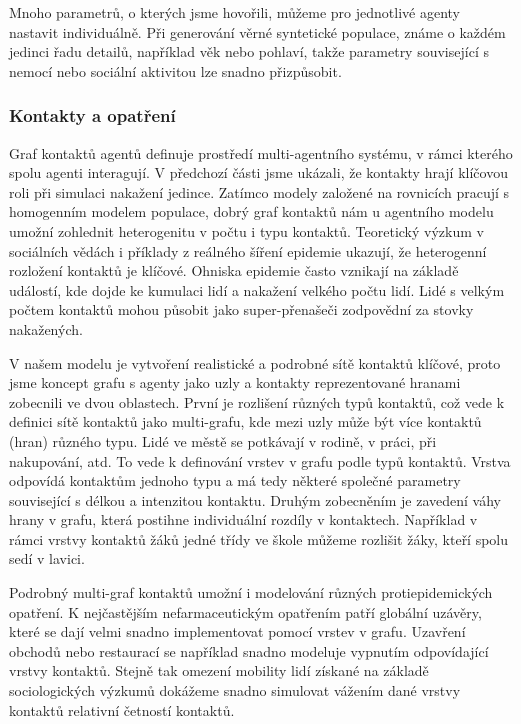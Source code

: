 Mnoho parametrů, o kterých jsme hovořili, můžeme pro jednotlivé agenty nastavit individuálně. Při generování věrné syntetické populace, známe o každém jedinci řadu detailů, například věk nebo pohlaví, takže parametry související s nemocí nebo sociální aktivitou lze snadno přizpůsobit. 




\subsubsection*{Kontakty a opatření}

Graf kontaktů agentů definuje prostředí multi-agentního systému, v rámci kterého spolu agenti interagují. V předchozí části jsme ukázali, že kontakty hrají klíčovou roli při simulaci nakažení jedince. Zatímco modely založené na rovnicích pracují s homogenním modelem populace, dobrý graf kontaktů nám u agentního modelu umožní zohlednit heterogenitu v počtu i typu kontaktů. Teoretický výzkum v sociálních vědách i příklady z reálného šíření epidemie ukazují, že heterogenní rozložení kontaktů je klíčové. Ohniska epidemie často vznikají na základě  událostí, kde dojde ke kumulaci lidí a nakažení velkého počtu lidí. Lidé s velkým počtem kontaktů mohou působit jako super-přenašeči zodpovědní za stovky nakažených.  

V našem modelu je vytvoření realistické a podrobné sítě kontaktů klíčové, proto jsme koncept grafu s agenty jako uzly a kontakty reprezentované hranami zobecnili ve dvou oblastech. První je rozlišení různých typů kontaktů, což vede k definici sítě kontaktů jako multi-grafu, kde mezi uzly může být více kontaktů (hran) různého typu. Lidé ve městě se potkávají v rodině, v práci, při nakupování, atd. To vede k definování vrstev v grafu podle typů kontaktů. Vrstva odpovídá kontaktům jednoho typu a má tedy některé společné parametry související s délkou a intenzitou kontaktu. Druhým zobecněním je zavedení váhy hrany v grafu, která postihne individuální rozdíly v kontaktech. Například v rámci vrstvy kontaktů žáků jedné třídy ve škole můžeme rozlišit žáky, kteří spolu sedí v lavici. 

Podrobný multi-graf kontaktů umožní i modelování různých protiepidemických opatření. K nejčastějším nefarmaceutickým opatřením patří globální uzávěry, které se dají velmi snadno implementovat pomocí vrstev v grafu. Uzavření obchodů nebo restaurací se například snadno modeluje vypnutím odpovídající vrstvy kontaktů. Stejně tak omezení mobility lidí získané na základě sociologických výzkumů dokážeme snadno simulovat vážením dané vrstvy kontaktů relativní četností kontaktů.

